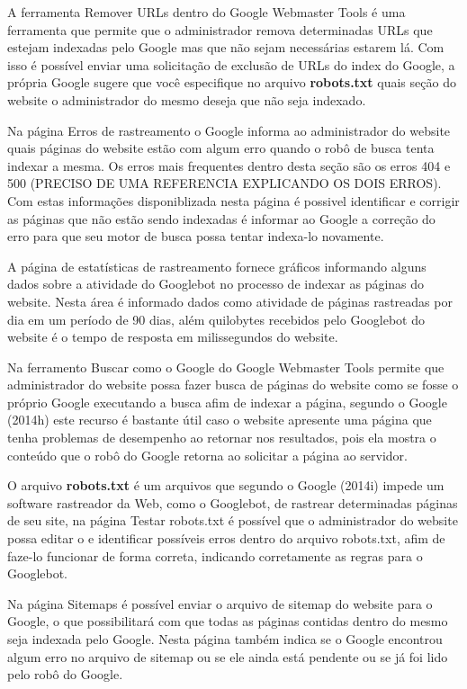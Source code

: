 \documentclass[
	12pt,				%
	openright,			%
	twoside,			%
	a4paper,			%
	english,			%
	french,				%
	spanish,			%
	brazil				%
	]{abntex2}
\begin{document}
A ferramenta Remover URLs dentro do Google Webmaster Tools é uma ferramenta que permite que o administrador remova determinadas URLs que estejam indexadas pelo Google mas que não sejam necessárias estarem lá. Com isso é possível enviar uma solicitação de exclusão de URLs do index do Google, a própria Google sugere que você especifique no arquivo \textbf{robots.txt} quais seção do website o administrador do mesmo deseja que não seja indexado.

Na página Erros de rastreamento o Google informa ao administrador do website quais páginas do website estão com algum erro quando o robô de busca tenta indexar a mesma. Os erros mais frequentes dentro desta seção são os erros 404 e 500 (PRECISO DE UMA REFERENCIA EXPLICANDO OS DOIS ERROS). Com estas informações disponiblizada nesta página é possivel identificar e corrigir as páginas que não estão sendo indexadas é informar ao Google a correção do erro para que seu motor de busca possa tentar indexa-lo novamente.

A página de estatísticas de rastreamento fornece gráficos informando alguns dados sobre a atividade do Googlebot no processo de indexar as páginas do website. Nesta área é informado dados como atividade de páginas rastreadas por dia em um período de 90 dias, além quilobytes recebidos pelo Googlebot do website é o tempo de resposta em milissegundos do website.

Na ferramento Buscar como o Google do Google Webmaster Tools permite que administrador do website possa fazer busca de páginas do website como se fosse o próprio Google executando a busca afim de indexar a página, segundo o Google (2014h) este recurso é bastante útil caso o website apresente uma página que tenha problemas de desempenho ao retornar nos resultados, pois ela mostra o conteúdo que o robô do Google retorna ao solicitar a página ao servidor.

O arquivo \textbf{robots.txt} é um arquivos que segundo o Google (2014i) impede um software rastreador da Web, como o Googlebot, de rastrear determinadas páginas de seu site, na página Testar robots.txt é possível que o administrador do website possa editar o e identificar possíveis erros dentro do arquivo robots.txt, afim de faze-lo funcionar de forma correta, indicando corretamente as regras para o Googlebot.

Na página Sitemaps é possível enviar o arquivo de sitemap do website para o Google, o que possibilitará com que todas as páginas contidas dentro do mesmo seja indexada pelo Google. Nesta página também indica se o Google encontrou algum erro no arquivo de sitemap ou se ele ainda está pendente ou se já foi lido pelo robô do Google.
\end{document}
